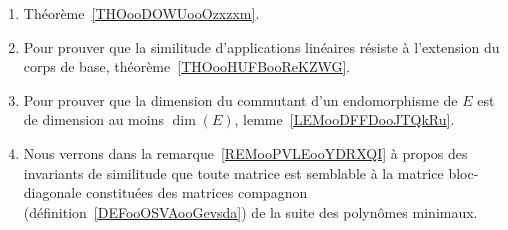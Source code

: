 
\begin{enumerate}
	\item
	      Théorème~\ref{THOooDOWUooOzxzxm}.
	\item
	      Pour prouver que la similitude d'applications linéaires résiste à l'extension du corps de base, théorème~\ref{THOooHUFBooReKZWG}.
	\item
	      Pour prouver que la dimension du commutant d'un endomorphisme de \( E\) est de dimension au moins \( \dim(E)\), lemme~\ref{LEMooDFFDooJTQkRu}.
	\item
	      Nous verrons dans la remarque~\ref{REMooPVLEooYDRXQI} à propos des invariants de similitude que toute matrice est semblable à la matrice bloc-diagonale constituées des matrices compagnon (définition~\ref{DEFooOSVAooGevsda}) de la suite des polynômes minimaux.
\end{enumerate}

